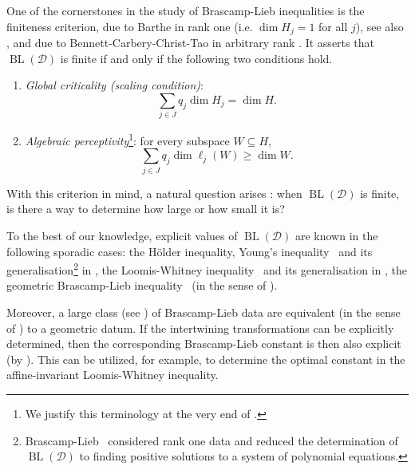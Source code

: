 \documentclass[a4paper,english]{amsart}
\theoremstyle{definition}
\newcommand{\1}{\mathbbm{1}}
\newcommand{\sD} {{\mathscr D}}
\DeclareMathOperator{\rk}{rk}
\DeclareMathOperator{\BL}{BL}
\begin{document}
One of the cornerstones in the study of Brascamp-Lieb inequalities is the finiteness criterion, due to Barthe \cite{Barthe98} in rank one  (i.e. $\dim H_j=1$ for all $j$), see also \cite{CLL04},
and due to Bennett-Carbery-Christ-Tao in arbitrary rank \cite{BCCT08, BCCT10}.
It asserts that $\BL(\sD)$ is finite if and only if the following two conditions hold.
\begin{enumerate}
\item \emph{Global criticality (scaling condition)}:
\begin{equation}\label{eq:gc}
\sum_{j \in J} q_j \dim H_j = \dim H.
\end{equation}
\item \emph{Algebraic perceptivity}\footnote{We justify this terminology at the very end of .}: for every subspace $W \subseteq H$,
\begin{equation}\label{eq:sumrk}
\sum_{j \in J} q_j \dim \ell_j(W) \geq \dim W.
\end{equation}
\end{enumerate}

With this criterion in mind, a natural question arises : when $\BL(\sD)$ is finite, is there a way to determine how large or how small it is?

To the best of our knowledge, explicit values of $\BL(\sD)$ are known in the following sporadic cases:
the Hölder inequality, Young's inequality~\cite{Beckner} and its generalisation\footnote{Brascamp-Lieb~\cite{BL76} considered rank one data and reduced the determination of $\BL(\sD)$ to finding positive solutions to a system of polynomial equations.} in \cite{BL76}, the Loomis-Whitney inequality~\cite{LoomisWhitney} and its generalisation in \cite{Finner}, the geometric Brascamp-Lieb inequality~\cite{Ball, Barthe98} (in the sense of \cite[Definition 2.1]{BCCT08}).

Moreover, a large class (see \cite[Theorem 7.13]{BCCT08}) of Brascamp-Lieb data are equivalent (in the sense of \cite[Definition 3.1]{BCCT08}) to a geometric datum.
If the intertwining transformations can be explicitly determined, then the corresponding Brascamp-Lieb constant is then also explicit (by \cite[Lemma 3.3]{BCCT08}).
This can be utilized, for example, to determine the optimal constant in the affine-invariant Loomis-Whitney inequality.
\end{document}
